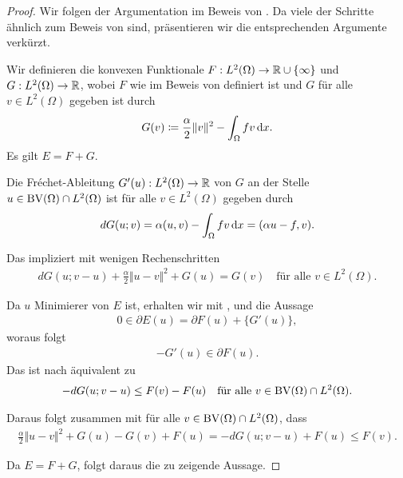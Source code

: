 \begin{proof}
  Wir folgen der Argumentation im Beweis von \cite[S. 309, Lemma 10.2]{Bar15}.
  Da viele der Schritte ähnlich zum Beweis von 
  sind, präsentieren wir die entsprechenden Argumente verkürzt.

  Wir definieren die konvexen Funktionale
  $F:L^2(\Omega)\to \mathbb{R}\cup\{\infty\}$ und $G:L^2(\Omega)\to \mathbb{R}$, wobei 
  $F$ wie im Beweis von  definiert ist und $G$
  für alle $v\in L^2(\Omega)$ gegeben ist durch 
  \begin{align*}
    G(v)\coloneqq \frac{\alpha}{2}\Vert v\Vert^2 - \int_\Omega f v\,\mathrm{d}x.
  \end{align*}
  Es gilt $E = F+G$.

  Die Fr\'echet-Ableitung $G'(u): L^2(\Omega)\to\mathbb{R}$ von $G$ an der Stelle
  $u\in \textup{BV}(\Omega)\cap L^2(\Omega)$ ist für alle $v\in L^2(\Omega)$ gegeben
  durch
  \begin{align*}
    dG(u;v) = \alpha (u,v) - \int_\Omega f v\,\mathrm{d}x 
    = (\alpha u-f ,v).
  \end{align*}

  Das impliziert mit wenigen Rechenschritten
  \begin{align}\label{eq:strongConvexityG}
    dG(u;v-u) +\frac{\alpha}{2}\Vert u-v\Vert^2+G(u) 
    =
    G(v)
    \quad\text{für alle } v\in L^2(\Omega).
  \end{align}

  Da $u$ Minimierer von $E$ ist, erhalten wir mit ,
   und  die Aussage
  \begin{align*}
    0\in\partial E(u) = \partial F(u)+\{G'(u)\},
  \end{align*}
  woraus folgt 
  \begin{align*}
    -G'(u)\in\partial F(u).
  \end{align*}
  Das ist nach  äquivalent zu
  \begin{align*}
    -dG(u;v-u)\leq F(v)-F(u)\quad\text{für alle }v\in\textup{BV}(\Omega)\cap
    L^2(\Omega).
  \end{align*}

  Daraus folgt zusammen mit  für alle $v\in
  \textup{BV}(\Omega)\cap L^2(\Omega)$, dass
  \begin{align*}
    \frac{\alpha}{2}\Vert u-v\Vert^2+G(u)-G(v)+F(u)
    = -dG(u;v-u)+F(u)\leq F(v).
  \end{align*}
  

  Da $E=F+G$, folgt daraus die zu zeigende Aussage.
\end{proof}


